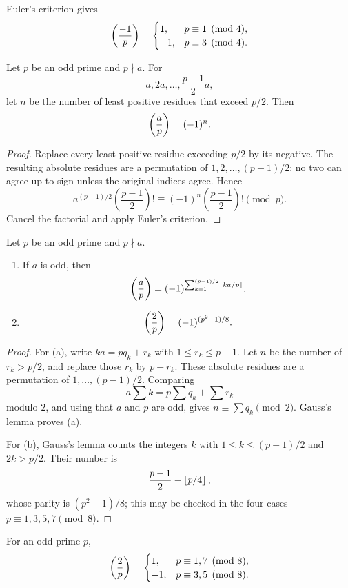 \begin{remark}
Euler's criterion gives
\[
 \left(\frac{-1}{p}\right)=
 \begin{cases}
 1,&p\equiv1\pmod4,\\
 -1,&p\equiv3\pmod4.
 \end{cases}
\]
\end{remark}

\begin{thm}
Let $p$ be an odd prime and $p\nmid a$.  For
\[
 a,2a,\ldots,\frac{p-1}{2}a,
\]
let $n$ be the number of least positive residues that exceed $p/2$.  Then
\[
 \left(\frac{a}{p}\right)=(-1)^n.
\]
\end{thm}
\begin{proof}
Replace every least positive residue exceeding $p/2$ by its negative.  The resulting absolute residues are a permutation of
$1,2,\ldots,(p-1)/2$: no two can agree up to sign unless the original indices agree.  Hence
\[
 a^{(p-1)/2}\left(\frac{p-1}{2}\right)!
 \equiv(-1)^n\left(\frac{p-1}{2}\right)!\pmod p.
\]
Cancel the factorial and apply Euler's criterion.
\end{proof}

\begin{thm}
Let $p$ be an odd prime and $p\nmid a$.
\begin{enumerate}[label=(\alph*)]
\item If $a$ is odd, then
\[
 \left(\frac{a}{p}\right)=(-1)^{\sum_{k=1}^{(p-1)/2}\left\lfloor ka/p \right\rfloor}.
\]
\item
\[
 \left(\frac{2}{p}\right)=(-1)^{(p^2-1)/8}.
\]
\end{enumerate}
\end{thm}
\begin{proof}
For (a), write $ka=pq_k+r_k$ with $1\le r_k\le p-1$.  Let $n$ be the number of $r_k>p/2$, and replace those $r_k$ by $p-r_k$.  These absolute residues are a permutation of $1,\ldots,(p-1)/2$.  Comparing
\[
 a\sum k=p\sum q_k+\sum r_k
\]
modulo $2$, and using that $a$ and $p$ are odd, gives
$n\equiv\sum q_k\pmod2$.  Gauss's lemma proves (a).

For (b), Gauss's lemma counts the integers $k$ with
$1\le k\le(p-1)/2$ and $2k>p/2$.  Their number is
\[
 \frac{p-1}{2}-\left\lfloor p/4 \right\rfloor,
\]
whose parity is $(p^2-1)/8$; this may be checked in the four cases $p\equiv1,3,5,7\pmod8$.
\end{proof}

\begin{cor}
For an odd prime $p$,
\[
 \left(\frac{2}{p}\right)=
 \begin{cases}
 1,&p\equiv1,7\pmod8,\\
 -1,&p\equiv3,5\pmod8.
 \end{cases}
\]
\end{cor}

